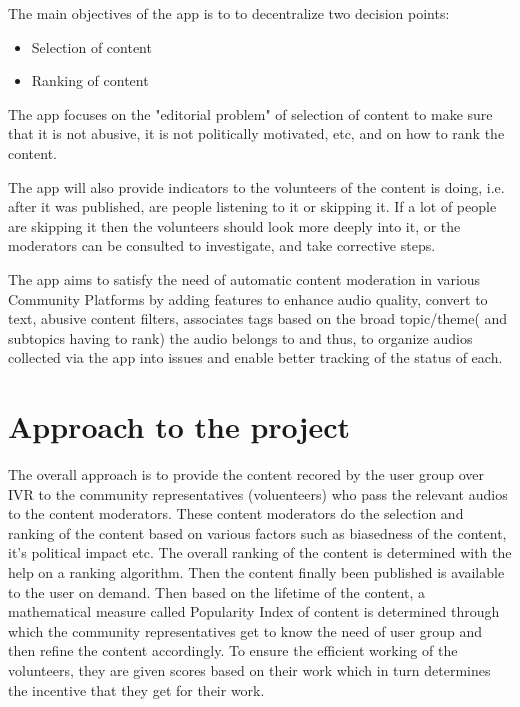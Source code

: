 \documentclass[11pt]{article}
\begin{document}
    The main objectives of the app is to to decentralize two decision points:
     \begin{itemize}
				\item
				        Selection of content
				\item
				        Ranking of content
			\end{itemize}
The app focuses on the "editorial problem" of selection of content to make sure that it is not abusive, it is not politically motivated, etc, and on how to rank the content.
\bigskip

The app will also provide indicators to the volunteers of the content is doing, i.e. after it was published, are people listening to it or skipping it. If a lot of people are skipping it then the volunteers should look more deeply into it, or the moderators can be consulted to investigate, and take corrective steps.

\bigskip

The app aims to satisfy the need of automatic content moderation in various Community Platforms by adding features to enhance audio quality, convert to text, abusive content filters, associates tags based on the broad topic/theme( and subtopics having to rank) the audio belongs to and thus, to organize audios collected via the app into issues and enable better tracking of the status of each.

\pagebreak
\section{Approach to the project}
    The overall approach is to provide the content recored by the user group over IVR to the community representatives (voluenteers) who pass the relevant audios to the content moderators. These content moderators do the selection and ranking of the content based on various factors such as biasedness of the content, it's political impact etc. The overall ranking of the content is determined with the help on a ranking algorithm. Then the content finally been published is available to the user on demand. Then based on the lifetime of the content, a mathematical measure called Popularity Index of content is determined through which the community representatives get to know the need of user group and then refine the content accordingly. To ensure the efficient working of the volunteers, they are given scores based on their work which in turn determines the incentive that they get for their work.
\end{document}
